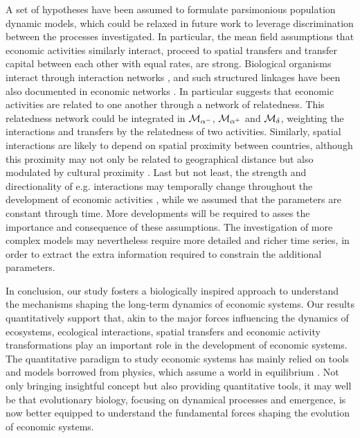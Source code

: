 A set of hypotheses have been assumed to formulate parsimonious population dynamic models, which could be relaxed in future work to leverage discrimination between the processes investigated. 
% 
In particular, the mean field assumptions that economic activities similarly interact, proceed to spatial transfers and transfer capital between each other with equal rates, are strong.
% 
Biological organisms interact through interaction networks \cite{Bascompte2003}, and  such structured linkages have been also documented in economic networks  \cite{C.A.HidalgoB.Klinger,Bustos2012,Saavedra2009a}. In particular \cite{C.A.HidalgoB.Klinger} suggests that economic activities are related to one another through a network of relatedness. This relatedness network could be integrated in $\mathcal{M}_{\alpha^-}$, $\mathcal{M}_{\alpha^+}$ and $\mathcal{M}_\delta$, weighting the interactions and transfers by the relatedness of two activities.
% 
Similarly, spatial interactions are likely to depend on spatial proximity between countries, although this proximity may not only be related to geographical distance but also modulated by cultural proximity \cite{Bahar2013}.
% 
Last but not least, the strength and directionality of e.g. interactions may temporally change throughout the development of economic activities \cite{Pistorius1997}, while we assumed that the parameters are constant through time.
% 
More developments will be required to asses the importance and consequence of these assumptions. The investigation of more complex models may nevertheless require more detailed and richer time series, in order to extract the extra information required to constrain the additional parameters.

In conclusion, our study fosters a biologically inspired approach to understand the mechanisms shaping the long-term dynamics of economic systems.
% 
Our results quantitatively support that, akin to the major forces influencing the dynamics of ecosystems, ecological interactions, spatial transfers and economic activity transformations play an important role in the development of economic systems. 
% 
The quantitative paradigm to study economic systems has mainly relied on tools and models borrowed from physics, which assume a world in equilibrium \cite{sornette2014physics}.
% 
Not only bringing insightful concept but also providing quantitative tools, it may well be that evolutionary biology, focusing on dynamical processes and emergence, is now better equipped to understand the fundamental forces shaping the evolution of economic systems.
% 
%
% 



